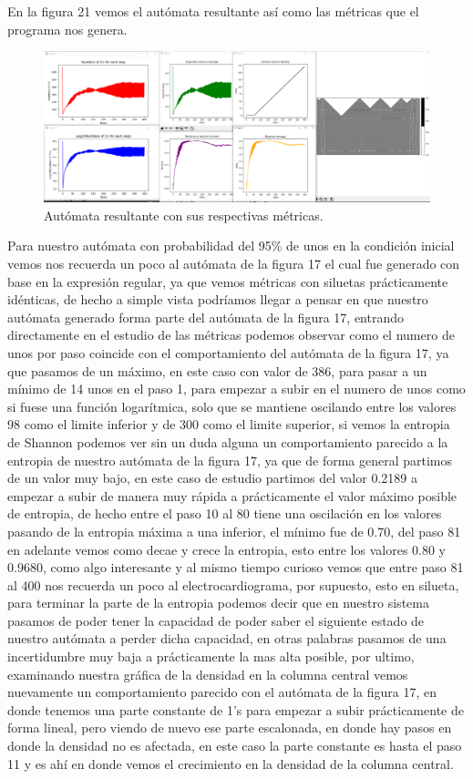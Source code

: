 \documentclass[11pt]{article}
\begin{document}
		En la figura 21 vemos el autómata resultante así como las métricas que el programa nos genera.
		\begin{figure}[H]
			\includegraphics[scale=0.26]{resources/RegEx54/95_prob_regex_result.png}
			\caption{Autómata resultante con sus respectivas métricas.}\label{fig:picture}
		\end{figure}
		 Para nuestro autómata con probabilidad del 95\% de unos en la condición inicial vemos nos recuerda un poco al autómata de la figura 17 el cual fue generado con base en la expresión regular, ya que vemos métricas con siluetas prácticamente idénticas, de hecho a simple vista podríamos llegar a pensar en que nuestro autómata generado forma parte del autómata de la figura 17, entrando directamente en el estudio de las métricas podemos observar como el numero de unos por paso coincide con el comportamiento del autómata de la figura 17, ya que pasamos de un máximo, en este caso con valor de 386, para pasar a un mínimo de 14 unos en el paso 1, para empezar a subir en el numero de unos como si fuese una función logarítmica, solo que se mantiene oscilando entre los valores 98 como el limite inferior y de 300 como el limite superior, si vemos la entropia de Shannon podemos ver sin un duda alguna un comportamiento parecido a la entropia de nuestro autómata de la figura 17, ya que de forma general partimos de un valor muy bajo, en este caso de estudio partimos del valor 0.2189 a empezar a subir de manera muy rápida a prácticamente el valor máximo posible de entropia, de hecho entre el paso 10 al 80 tiene una oscilación en los valores pasando de la entropia máxima a una inferior, el mínimo fue de 0.70, del paso 81 en adelante vemos como decae y crece la entropia, esto entre los valores 0.80 y 0.9680, como algo interesante y al mismo tiempo curioso vemos que entre paso 81 al 400 nos recuerda un poco al electrocardiograma, por supuesto, esto en silueta, para terminar la parte de la entropia podemos decir que en nuestro sistema pasamos de poder tener la capacidad de poder saber el siguiente estado de nuestro autómata a perder dicha capacidad, en otras palabras pasamos de una incertidumbre muy baja a prácticamente la mas alta posible, por ultimo, examinando nuestra gráfica de la densidad en la columna central vemos nuevamente un comportamiento parecido con el autómata de la figura 17, en donde tenemos una parte constante de 1's para empezar a subir prácticamente de forma lineal, pero viendo de nuevo ese parte escalonada, en donde hay pasos en donde la densidad no es afectada, en este caso la parte constante es hasta el paso 11 y es ahí en donde vemos el crecimiento en la densidad de la columna central.\par
\end{document}
